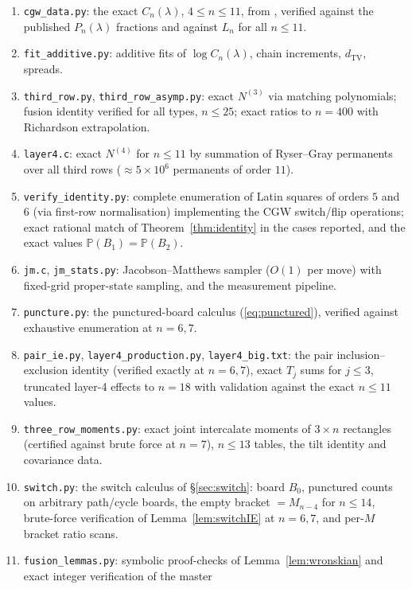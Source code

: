 \documentclass[11pt]{article}
\theoremstyle{definition}
\newcommand{\dtv}{d_{\mathrm{TV}}}
\renewcommand{\Pr}{\mathbb{P}}
\newcommand{\PP}{P}
\newcommand{\CC}{C}
\begin{document}
\begin{enumerate}[leftmargin=2em]
\item \texttt{cgw\_data.py}: the exact $\CC_n(\lambda)$, $4\le n\le11$, from
\cite[Tables 1--2]{CGW08}, verified against the published
$\PP_n(\lambda)$ fractions and against $L_n$ for all $n\le11$.
\item \texttt{fit\_additive.py}: additive fits of
$\log \CC_n(\lambda)$, chain increments, $\dtv$, spreads.
\item \texttt{third\_row.py}, \texttt{third\_row\_asymp.py}: exact
$N^{(3)}$ via matching polynomials; fusion identity verified for all types,
$n\le25$; exact ratios to $n=400$ with Richardson extrapolation.
\item \texttt{layer4.c}: exact $N^{(4)}$ for $n\le11$ by summation of
Ryser--Gray permanents over all third rows ($\approx5\times10^6$ permanents
of order $11$).
\item \texttt{verify\_identity.py}: complete enumeration of Latin squares of
orders $5$ and $6$ (via first-row normalisation) implementing the CGW
switch/flip operations; exact rational match of
Theorem~\ref{thm:identity} in the cases reported, and the exact values
$\Pr(B_1)=\Pr(B_2)$.
\item \texttt{jm.c}, \texttt{jm\_stats.py}: Jacobson--Matthews sampler
($O(1)$ per move) with fixed-grid proper-state sampling, and the
measurement pipeline.
\item \texttt{puncture.py}: the punctured-board calculus
(\eqref{eq:punctured}), verified against exhaustive enumeration at
$n=6,7$.
\item \texttt{pair\_ie.py}, \texttt{layer4\_production.py},
\texttt{layer4\_big.txt}: the pair inclusion--exclusion identity
(verified exactly at $n=6,7$), exact $T_j$ sums for $j\le3$, truncated
layer-4 effects to $n=18$ with validation against the exact
$n\le11$ values.
\item \texttt{three\_row\_moments.py}: exact joint intercalate moments of
$3\times n$ rectangles (certified against brute force at $n=7$),
$n\le13$ tables, the tilt identity and covariance data.
\item \texttt{switch.py}: the switch calculus of \S\ref{sec:switch}:
board $B_0$, punctured counts on arbitrary path/cycle boards, the empty
bracket $=M_{n-4}$ for $n\le14$, brute-force verification of
Lemma~\ref{lem:switchIE} at $n=6,7$, and per-$M$ bracket ratio scans.
\item \texttt{fusion\_lemmas.py}: symbolic proof-checks of
Lemma~\ref{lem:wronskian} and exact integer verification of the master

\end{enumerate}
\end{document}
